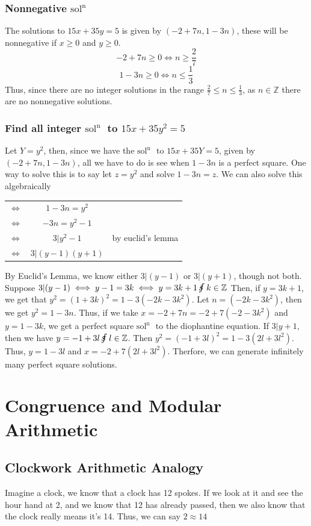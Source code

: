 \documentclass[oneside]{book}
\newcommand\tab[1][1cm]{\hspace*{#1}}
\newcommand\nextline{\newline\tab}
\newcommand\soln{$\text{sol}^\text{n}\text{ }$}
\newcommand\fs{\mbox{\large $\mathrlap{f}s\,$}\,}
\begin{document}
\subsection{Nonnegative \soln}
\tab
The solutions to $15x+35y=5$ is given by $(-2+7n, 1-3n)$, these will be nonnegative if $x\geq0$ and $y\geq0$.
$$-2+7n\geq 0 \iff n\geq \frac{2}{7}$$
$$1-3n \geq 0 \iff n \leq \frac{1}{3}$$
Thus, since there are no integer solutions in the range $\frac{2}{7}\leq n \leq \frac{1}{3}$, as $n\in\mathbb{Z}$ there are no nonnegative solutions.
\subsection{Find all integer \soln to $15x+35y^2 = 5$}
\tab
Let $Y=y^2$, then, since we have the \soln to $15x+35Y=5$, given by $(-2+7n, 1-3n)$, all we have to do is see when $1-3n$ is a perfect square.
One way to solve this is to say let $z=y^2$ and solve $1-3n=z$. We can also solve this algebraically
\newline
\begin{center}
\begin{tabular}{c c c}
$\iff$ & $1-3n = y^2$ & \\
$\iff$ & $-3n=y^2-1$ & \\
$\iff$ & $3\lvert y^2-1$ & by euclid's lemma \\
$\iff$ & $3\lvert(y-1)(y+1)$ & \\
\end{tabular}
\end{center}
\tab
By Euclid's Lemma, we know either $3\lvert(y-1)$ or $3\lvert(y+1)$, though not both. Suppose $3\lvert(y-1) \iff y-1=3k\iff y=3k+1\, \fs k\in\mathbb{Z}$
Then, if $y=3k+1$, we get that $y^2=(1+3k)^2=1-3(-2k-3k^2)$. Let $n=(-2k-3k^2)$, then we get $y^2=1-3n$. Thus, if we take $x=-2+7n=-2+7(-2-3k^2)$ and $y=1-3k$, we get a perfect square \soln to the diophantine equation. 
\nextline
If $3\lvert y+1$, then we have $y=-1+3l\, \fs l \in \mathbb{Z}$. Then $y^2=(-1+3l)^2=1-3(2l+3l^2)$. Thus, $y=1-3l$ and $x=-2+7(2l+3l^2)$. Therfore, we can generate infinitely many perfect square solutions.
\chapter{Congruence and Modular Arithmetic}
\section{Clockwork Arithmetic Analogy}
\tab
Imagine a clock, we know that a clock has 12 spokes. If we look at it and see the hour hand at 2, and we know that 12 has already passed, then we also know that the clock really means it's 14. Thus, we can say $2\approx14$
\end{document}
